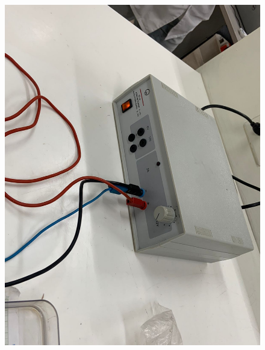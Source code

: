 \documentclass[letterpaper, 12pt]{report}
\begin{document}
\begin{figure}[H]
	\begin{center}
		\includegraphics[scale = 0.3]{./Images/3.jpeg}
	\end{center}
\end{figure}
\end{document}
